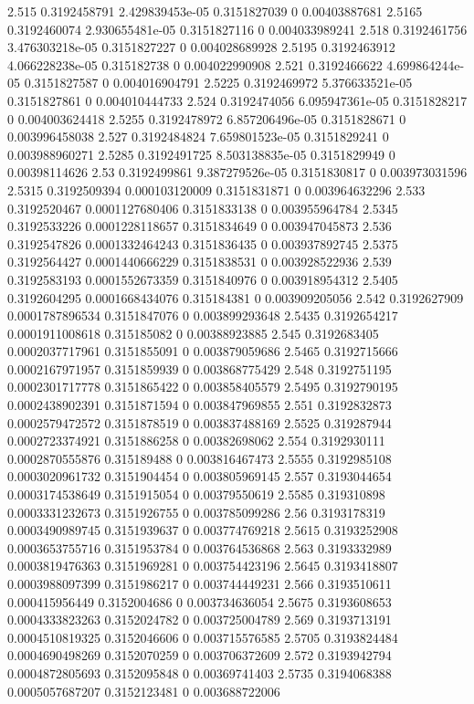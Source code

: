 {2.515 0.3192458791 2.429839453e-05 0.3151827039 0 0.00403887681
2.5165 0.3192460074 2.930655481e-05 0.3151827116 0 0.004033989241
2.518 0.3192461756 3.476303218e-05 0.3151827227 0 0.004028689928
2.5195 0.3192463912 4.066228238e-05 0.315182738 0 0.004022990908
2.521 0.3192466622 4.699864244e-05 0.3151827587 0 0.004016904791
2.5225 0.3192469972 5.376633521e-05 0.3151827861 0 0.004010444733
2.524 0.3192474056 6.095947361e-05 0.3151828217 0 0.004003624418
2.5255 0.3192478972 6.857206496e-05 0.3151828671 0 0.003996458038
2.527 0.3192484824 7.659801523e-05 0.3151829241 0 0.003988960271
2.5285 0.3192491725 8.503138835e-05 0.3151829949 0 0.00398114626
2.53 0.3192499861 9.387279526e-05 0.3151830817 0 0.003973031596
2.5315 0.3192509394 0.000103120009 0.3151831871 0 0.003964632296
2.533 0.3192520467 0.0001127680406 0.3151833138 0 0.003955964784
2.5345 0.3192533226 0.0001228118657 0.3151834649 0 0.003947045873
2.536 0.3192547826 0.0001332464243 0.3151836435 0 0.003937892745
2.5375 0.3192564427 0.0001440666229 0.3151838531 0 0.003928522936
2.539 0.3192583193 0.0001552673359 0.3151840976 0 0.003918954312
2.5405 0.3192604295 0.0001668434076 0.315184381 0 0.003909205056
2.542 0.3192627909 0.0001787896534 0.3151847076 0 0.003899293648
2.5435 0.3192654217 0.0001911008618 0.315185082 0 0.00388923885
2.545 0.3192683405 0.0002037717961 0.3151855091 0 0.003879059686
2.5465 0.3192715666 0.0002167971957 0.3151859939 0 0.003868775429
2.548 0.3192751195 0.0002301717778 0.3151865422 0 0.003858405579
2.5495 0.3192790195 0.0002438902391 0.3151871594 0 0.003847969855
2.551 0.3192832873 0.0002579472572 0.3151878519 0 0.003837488169
2.5525 0.319287944 0.0002723374921 0.3151886258 0 0.00382698062
2.554 0.3192930111 0.0002870555876 0.315189488 0 0.003816467473
2.5555 0.3192985108 0.0003020961732 0.3151904454 0 0.003805969145
2.557 0.3193044654 0.0003174538649 0.3151915054 0 0.00379550619
2.5585 0.319310898 0.0003331232673 0.3151926755 0 0.003785099286
2.56 0.3193178319 0.0003490989745 0.3151939637 0 0.003774769218
2.5615 0.3193252908 0.0003653755716 0.3151953784 0 0.003764536868
2.563 0.3193332989 0.0003819476363 0.3151969281 0 0.003754423196
2.5645 0.3193418807 0.0003988097399 0.3151986217 0 0.003744449231
2.566 0.3193510611 0.000415956449 0.3152004686 0 0.003734636054
2.5675 0.3193608653 0.0004333823263 0.3152024782 0 0.003725004789
2.569 0.3193713191 0.0004510819325 0.3152046606 0 0.003715576585
2.5705 0.3193824484 0.0004690498269 0.3152070259 0 0.003706372609
2.572 0.3193942794 0.0004872805693 0.3152095848 0 0.00369741403
2.5735 0.3194068388 0.0005057687207 0.3152123481 0 0.003688722006
}

